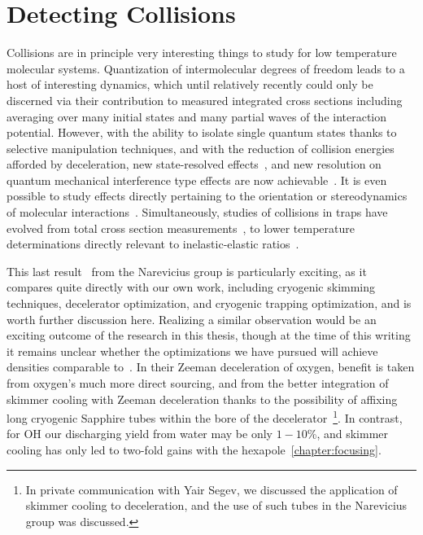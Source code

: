 \ifx\justbeingincluded\undefined


\fi

\chapter{Detecting Collisions}
\label{chapter:collisions}


Collisions are in principle very interesting things to study for low temperature molecular systems. 
Quantization of intermolecular degrees of freedom leads to a host of interesting dynamics, which until relatively recently could only be discerned via their contribution to measured integrated cross sections including averaging over many initial states and many partial waves of the interaction potential.
However, with the ability to isolate single quantum states thanks to selective manipulation techniques, and with the reduction of collision energies afforded by deceleration, new state-resolved effects~\cite{Greenberg2018}, and new resolution on quantum mechanical interference type effects are now achievable~\cite{Zastrow2014,Klein2016}.
It is even possible to study effects directly pertaining to the orientation or stereodynamics of molecular interactions~\cite{Perreault2017}.
Simultaneously, studies of collisions in traps have evolved from total cross section measurements~\cite{Sawyer2008,Wiederkehr2012}, to lower temperature determinations directly relevant to inelastic-elastic ratios~\cite{Marx2015,Wu2017,Segev2019}.

This last result~\cite{Segev2019} from the Narevicius group is particularly exciting, as it compares quite directly with our own work, including cryogenic skimming techniques, decelerator optimization, and cryogenic trapping optimization, and is worth further discussion here.
Realizing a similar observation would be an exciting outcome of the research in this thesis, though at the time of this writing it remains unclear whether the optimizations we have pursued will achieve densities comparable to~\cite{Segev2019}. 
In their Zeeman deceleration of oxygen, benefit is taken from oxygen's much more direct sourcing, and from the better integration of skimmer cooling with Zeeman deceleration thanks to the possibility of affixing long cryogenic Sapphire tubes within the bore of the decelerator~\footnote{In private communication with Yair Segev, we discussed the application of skimmer cooling to deceleration, and the use of such tubes in the Narevicius group was discussed.}.
In contrast, for OH our discharging yield from water may be only $1-10$\%, and skimmer cooling has only led to two-fold gains with the hexapole~\ref{chapter:focusing}.

